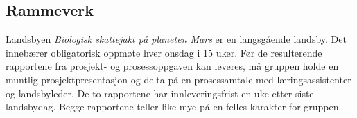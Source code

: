 \subsection{Rammeverk}

Landsbyen \textit{Biologisk skattejakt på planeten Mars} er en langsgående landsby.
Det innebærer obligatorisk oppmøte hver onsdag i 15 uker. Før de resulterende rapportene fra prosjekt- og prosessoppgaven kan leveres, må gruppen holde en muntlig prosjektpresentasjon og delta på en prosessamtale med læringsassistenter og landsbyleder.
De to rapportene har innleveringsfrist en uke etter siste landsbydag. Begge rapportene teller like mye på en felles karakter for gruppen.